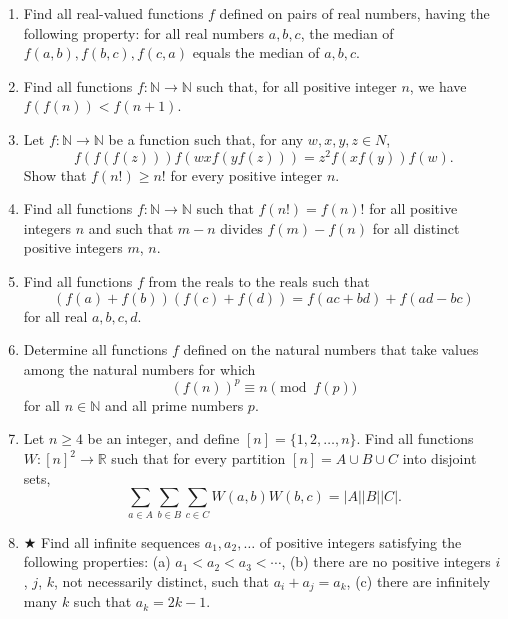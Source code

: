 \begin{enumerate}
    


    \item Find all real-valued functions $f$ defined on pairs of real numbers, having the following property: for all real numbers $a, b, c$, the median of $f(a,b), f(b,c), f(c,a)$ equals the median of $a, b, c$.

    


    \item Find all functions $f: \mathbb{N} \rightarrow \mathbb{N}$ such that, for all positive integer $n$, we have $f(f(n)) < f(n + 1)$.

    


    \item Let $f: \mathbb{N} \to \mathbb{N}$ be a function such that, for any $w, x, y, z \in N$,
    \[f(f(f(z))) f(wxf(yf(z))) = z^2 f(xf(y)) f(w).\]Show that $f(n!) \ge n!$ for every positive integer $n$.

    


    \item Find all functions $f: \mathbb{N} \rightarrow \mathbb{N}$ such that $f(n!) = f(n)!$ for all positive integers $n$ and such that $m-n$ divides $f(m) - f(n)$ for all distinct positive integers $m$, $n$.

    


    \item Find all functions $f$ from the reals to the reals such that
    \[(f(a) + f(b))(f(c) + f(d)) = f(ac + bd) + f(ad - bc)\]for all real $a, b, c, d$.

    


    \item Determine all functions $f$ defined on the natural numbers that take values among the natural numbers for which
    \[(f(n))^p \equiv n \pmod{f(p)}\]for all $n \in \mathbb{N}$ and all prime numbers $p$.

    


    \item Let $n \ge 4$ be an integer, and define $[n] = \{1, 2, \ldots, n\}$. Find all functions $W: [n]^2 \to \mathbb{R}$ such that for every partition $[n] = A \cup B \cup C$ into disjoint sets,
    \[\sum_{a \in A} \sum_{b \in B} \sum_{c \in C} W(a,b) W(b,c) = |A| |B| |C|.\]

    


    \item $ \bigstar $ Find all infinite sequences $a_1, a_2, \ldots$ of positive integers satisfying the following properties:
    (a) $a_1 < a_2 < a_3 < \cdots$,
    (b) there are no positive integers $i$, $j$, $k$, not necessarily distinct, such that $a_i + a_j = a_k$,
    (c) there are infinitely many $k$ such that $a_k = 2k - 1$.


\end{enumerate}

